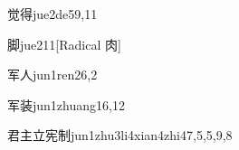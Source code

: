 \begin{entry}{觉得}{jue2de5}{9,11}
\end{entry}

\begin{entry}{脚}{jue2}{11}[Radical 肉]
\end{entry}

\begin{entry}{军人}{jun1ren2}{6,2}
\end{entry}

\begin{entry}{军装}{jun1zhuang1}{6,12}
\end{entry}

\begin{entry}{君主立宪制}{jun1zhu3li4xian4zhi4}{7,5,5,9,8}
\end{entry}


